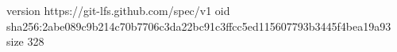 version https://git-lfs.github.com/spec/v1
oid sha256:2abe089c9b214c70b7706c3da22bc91c3ffcc5ed115607793b3445f4bea19a93
size 328
